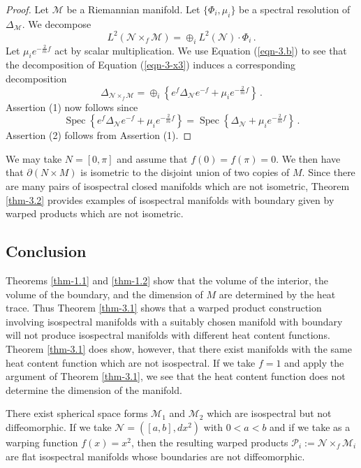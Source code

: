 \documentclass{amsart}
\begin{document}
\begin{proof} Let $\mathcal{M}$ be a Riemannian
manifold. Let $\{\Phi_i,\mu_i\}$ be a spectral resolution of $\Delta_{\mathcal{M}}$. We decompose
\begin{equation}\label{eqn-3-x3}
L^2(\mathcal{N}\times_f\mathcal{M})=\oplus_i L^2(\mathcal{N})\cdot\Phi_i\,.
\end{equation}
Let $\mu_ie^{-\frac2mf}$ act by scalar multiplication. We use Equation (\ref{eqn-3.b}) to see that the
decomposition of Equation (\ref{eqn-3-x3}) induces a corresponding decomposition
$$\displaystyle\Delta_{\mathcal{N}\times_f\mathcal{M}}=\oplus_i
\left\{e^f\Delta_{\mathcal{N}}e^{-f}+\mu_ie^{-\frac2mf}\right\}\,.$$
Assertion (1) now follows since
$$\operatorname{Spec}\left\{e^f\Delta_{\mathcal{N}}e^{-f}+\mu_ie^{-\frac2mf}\right\}
=\operatorname{Spec}\left\{\Delta_{\mathcal{N}}+\mu_ie^{-\frac2mf}\right\}\,.$$
Assertion (2) follows from Assertion (1).
\end{proof}

We may take $N=[0,\pi]$ and assume that $f(0)=f(\pi)=0$. We then have that $\partial(N\times M)$ is isometric
to the disjoint union of two copies of $M$. Since there are many pairs of isospectral closed manifolds which
are not isometric, Theorem
\ref{thm-3.2} provides examples of isospectral manifolds with boundary given by warped products which are not
isometric.

\subsection{Conclusion} Theorems \ref{thm-1.1} and \ref{thm-1.2} show that the volume of the
interior, the volume of the boundary, and the dimension of $M$ are determined by the heat trace. Thus Theorem
\ref{thm-3.1} shows that a warped product construction involving isospectral manifolds with a suitably chosen
manifold with boundary will not produce isospectral manifolds with different heat content functions. Theorem
\ref{thm-3.1} does show, however, that there exist manifolds with the same heat content function which are not
isospectral. If we take $f=1$ and apply the argument of Theorem \ref{thm-3.1}, we see that the heat content
function does not determine the dimension of the manifold.

There exist spherical space forms $\mathcal{M}_1$ and $\mathcal{M}_2$ which are isospectral but not
diffeomorphic. If we take
$\mathcal{N}=([a,b],dx^2)$ with $0<a<b$ and if we take as a warping function
$f(x)=x^2$, then the resulting warped products $\mathcal{P}_i:=\mathcal{N}\times_f\mathcal{M}_i$ are flat
isospectral manifolds whose boundaries are not diffeomorphic.
\end{document}
